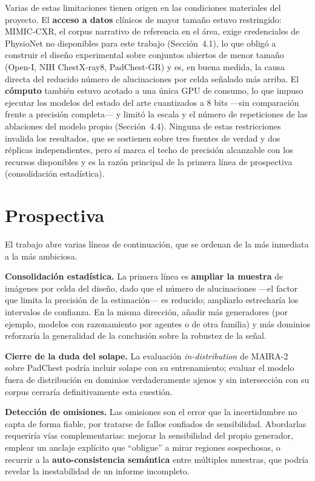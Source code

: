 Varias de estas limitaciones tienen origen en las condiciones materiales del proyecto. El
\textbf{acceso a datos} clínicos de mayor tamaño estuvo restringido: MIMIC-CXR, el corpus narrativo
de referencia en el área, exige credenciales de PhysioNet no disponibles para este trabajo
(Sección~4.1), lo que obligó a construir el diseño experimental sobre conjuntos abiertos de menor
tamaño (Open-I, NIH ChestX-ray8, PadChest-GR) y es, en buena medida, la causa directa del reducido
número de alucinaciones por celda señalado más arriba. El \textbf{cómputo} también estuvo acotado a
una única GPU de consumo, lo que impuso ejecutar los modelos del estado del arte cuantizados a 8
bits —sin comparación frente a precisión completa— y limitó la escala y el número de repeticiones
de las ablaciones del modelo propio (Sección~4.4). Ninguna de estas restricciones invalida los
resultados, que se sostienen sobre tres fuentes de verdad y dos réplicas independientes, pero sí
marca el techo de precisión alcanzable con los recursos disponibles y es la razón principal de la
primera línea de prospectiva (consolidación estadística).

\section{Prospectiva}
El trabajo abre varias líneas de continuación, que se ordenan de la más inmediata a la más ambiciosa.

\textbf{Consolidación estadística.} La primera línea es \textbf{ampliar la muestra} de imágenes por
celda del diseño, dado que el número de alucinaciones —el factor que limita la precisión de la
estimación— es reducido; ampliarlo estrecharía los intervalos de confianza. En la misma dirección,
añadir más generadores (por ejemplo, modelos con razonamiento por agentes o de otra familia) y más
dominios reforzaría la generalidad de la conclusión sobre la robustez de la señal.

\textbf{Cierre de la duda del solape.} La evaluación \emph{in-distribution} de MAIRA-2 sobre PadChest
podría incluir solape con su entrenamiento; evaluar el modelo fuera de distribución en dominios
verdaderamente ajenos y sin intersección con su corpus cerraría definitivamente esta cuestión.

\textbf{Detección de omisiones.} Las omisiones son el error que la incertidumbre no capta de forma
fiable, por tratarse de fallos confiados de sensibilidad. Abordarlas requeriría vías complementarias:
mejorar la sensibilidad del propio generador, emplear un anclaje explícito que ``obligue'' a mirar
regiones sospechosas, o recurrir a la \textbf{auto-consistencia semántica} entre múltiples muestras,
que podría revelar la inestabilidad de un informe incompleto.

